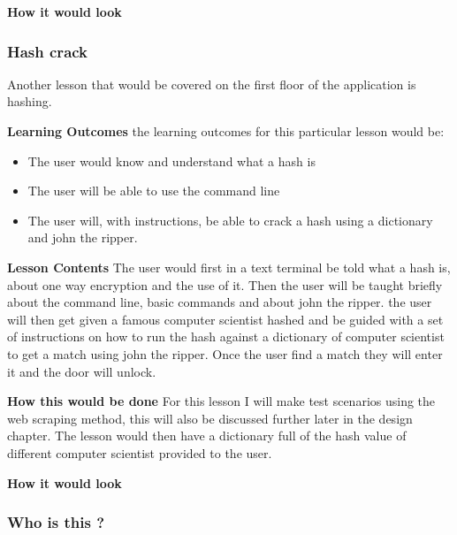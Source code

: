 \documentclass[12pt,a4paper]{article}
\begin{document}
\textbf{How it would look} 

 


 
\subsubsection{Hash crack}   

Another lesson that would be covered on the first floor of the application is hashing. 

\textbf{Learning Outcomes} 
\newline the learning outcomes for this particular lesson would be:  

\begin{itemize}\itemsep0pt
	\item The user would know and understand what a hash is 
	\item The user will be able to use the command line 
	\item The user will, with instructions, be able to crack a hash using a dictionary and john the ripper. 
\end{itemize} 

\textbf{Lesson Contents} 
\newline The user would first in a text terminal be told what a hash is, about one way encryption and the use of it. Then the user will be taught briefly about the command line, basic commands and about john the ripper. the user will then get given a famous computer scientist hashed and be guided with a set of instructions on how to run the hash against a dictionary of computer scientist to get a match using john the ripper. Once the user find a match they will enter it and the door will unlock.

\textbf{How this would be done} 
\newline For this lesson I will make test scenarios using the web scraping method, this will also be discussed further later in the design chapter. The lesson would then have a dictionary full of the hash value of different computer scientist provided to the user.  

\textbf{How it would look} 
 

\subsubsection{Who is this ?}
\end{document}
